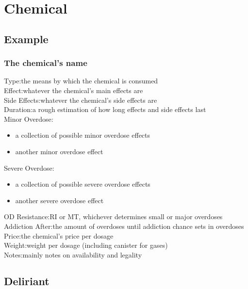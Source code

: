 
\section{Chemical}
\label{chems}
\subsection{Example}
\subsubsection{The chemical's name}
Type:\tab the means by which the chemical is consumed\\
Effect:\tab whatever the chemical's main effects are\\
Side Effects:\tab whatever the chemical's side effects are\\
Duration:\tab a rough estimation of how long effects and side effects last\\
Minor Overdose:\\
\begin{itemize}
	\setlength\itemsep{-8mm}
	\vspace{-12mm}
	\item a collection of possible minor overdose effects
	\item another minor overdose effect
\end{itemize}
Severe Overdose:\\
\begin{itemize}
	\setlength\itemsep{-8mm}
	\vspace{-12mm}
	\item a collection of possible severe overdose effects
	\item another severe overdose effect
\end{itemize}
OD Resistance:\tab RI or MT, whichever determines small or major overdoses\\
Addiction After:\tab the amount of overdoses until addiction chance sets in overdoses\\
Price:\tab the chemical's price per dosage\\
Weight:\tab weight per dosage (including canister for gases)\\
Notes:\tab mainly notes on availability and legality


\subsection{Deliriant}
